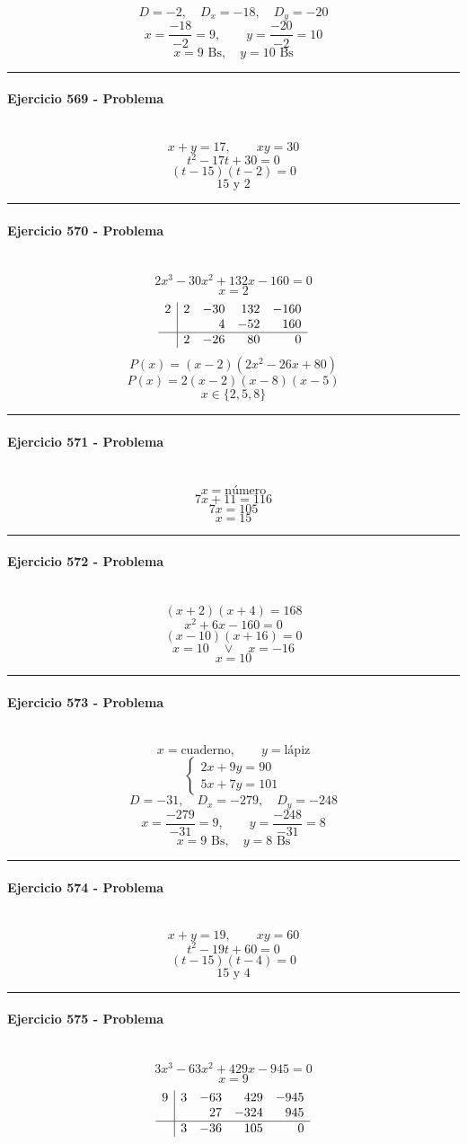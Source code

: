 \documentclass[10pt,a4paper]{article}
\newcommand{\res}[1]{\paragraph{#1}\mbox{}\\[-1.2em]}
\begin{document}
\[ D=-2,\quad D_x=-18,\quad D_y=-20 \]
\[ x=\frac{-18}{-2}=9,\qquad y=\frac{-20}{-2}=10 \]
\[ \boxed{x=9\text{ Bs},\quad y=10\text{ Bs}} \]
\vspace{1mm}\hrule\vspace{2mm}
\res{Ejercicio 569 - Problema}
\[ x+y=17,\qquad xy=30 \]
\[ t^2-17t+30=0 \]
\[ (t-15)(t-2)=0 \]
\[ \boxed{15\text{ y }2} \]
\vspace{1mm}\hrule\vspace{2mm}
\res{Ejercicio 570 - Problema}
\[ 2 x^{3} - 30 x^{2} + 132 x - 160=0 \]
\[ x=2 \]
\[\begin{array}{r|rrrr}2 & 2 & -30 & 132 & -160\\  &  & 4 & -52 & 160\\\hline  & 2 & -26 & 80 & 0\end{array}\]
\[ P(x)=(x-2)(2 x^{2} - 26 x + 80) \]
\[ P(x)=2(x-2)(x-8)(x-5) \]
\[ \boxed{x\in\{2,5,8\}} \]
\vspace{1mm}\hrule\vspace{2mm}
\res{Ejercicio 571 - Problema}
\[ x=\text{número} \]
\[ 7x+11=116 \]
\[ 7x=105 \]
\[ \boxed{x=15} \]
\vspace{1mm}\hrule\vspace{2mm}
\res{Ejercicio 572 - Problema}
\[ (x+2)(x+4)=168 \]
\[ x^{2} + 6 x - 160=0 \]
\[ (x-10)(x+16)=0 \]
\[ x=10\quad \vee \quad x=-16 \]
\[ \boxed{x=10} \]
\vspace{1mm}\hrule\vspace{2mm}
\res{Ejercicio 573 - Problema}
\[ x=\text{cuaderno},\qquad y=\text{lápiz} \]
\[ \begin{cases}2x+9y=90\\5x+7y=101\end{cases} \]
\[ D=-31,\quad D_x=-279,\quad D_y=-248 \]
\[ x=\frac{-279}{-31}=9,\qquad y=\frac{-248}{-31}=8 \]
\[ \boxed{x=9\text{ Bs},\quad y=8\text{ Bs}} \]
\vspace{1mm}\hrule\vspace{2mm}
\res{Ejercicio 574 - Problema}
\[ x+y=19,\qquad xy=60 \]
\[ t^2-19t+60=0 \]
\[ (t-15)(t-4)=0 \]
\[ \boxed{15\text{ y }4} \]
\vspace{1mm}\hrule\vspace{2mm}
\res{Ejercicio 575 - Problema}
\[ 3 x^{3} - 63 x^{2} + 429 x - 945=0 \]
\[ x=9 \]
\[\begin{array}{r|rrrr}9 & 3 & -63 & 429 & -945\\  &  & 27 & -324 & 945\\\hline  & 3 & -36 & 105 & 0\end{array}\]
\end{document}
